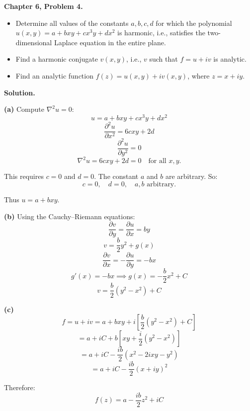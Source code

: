 \documentclass[12pt]{article}
\begin{document}
\textbf{Chapter 6, Problem 4.}
\begin{itemize}
\item[(a)] Determine all values of the constants $a, b, c, d$ for which the polynomial $u(x,y) = a + bxy + cx^3y + dx^2$ is harmonic, i.e., satisfies the two-dimensional Laplace equation in the entire plane.
\item[(b)] Find a harmonic conjugate $v(x,y)$, i.e., $v$ such that $f = u + iv$ is analytic.
\item[(c)] Find an analytic function $f(z) = u(x,y) + iv(x,y)$, where $z = x + iy$.
\end{itemize}

\bigskip
\textbf{Solution.}

\textbf{(a)} Compute $\nabla^2 u = 0$:
\[
u = a + bxy + cx^3y + dx^2
\]
\[
\frac{\partial^2 u}{\partial x^2} = 6cxy + 2d
\]
\[
\frac{\partial^2 u}{\partial y^2} = 0
\]
\[
\nabla^2 u = 6cxy + 2d = 0 \quad \text{for all } x, y.
\]

This requires $c = 0$ and $d = 0$. The constant $a$ and $b$ are arbitrary. So:
\[
\boxed{c = 0, \quad d = 0, \quad a,b \text{ arbitrary.}}
\]

Thus $u = a + bxy$.

\textbf{(b)} Using the Cauchy--Riemann equations:
\[
\frac{\partial v}{\partial y} = \frac{\partial u}{\partial x} = by
\]
\[
v = \frac{b}{2}y^2 + g(x)
\]
\[
\frac{\partial v}{\partial x} = -\frac{\partial u}{\partial y} = -bx
\]
\[
g'(x) = -bx \implies g(x) = -\frac{b}{2}x^2 + C
\]
\[
\boxed{v = \frac{b}{2}(y^2 - x^2) + C}
\]

\textbf{(c)}
\[
f = u + iv = a + bxy + i\left[\frac{b}{2}(y^2-x^2) + C\right]
\]
\[
= a + iC + b\left[xy + \frac{i}{2}(y^2 - x^2)\right]
\]
\[
= a + iC - \frac{ib}{2}(x^2 - 2ixy - y^2)
\]
\[
= a + iC - \frac{ib}{2}(x+iy)^2
\]

Therefore:
\[
\boxed{f(z) = a - \frac{ib}{2}z^2 + iC}
\]
\end{document}
